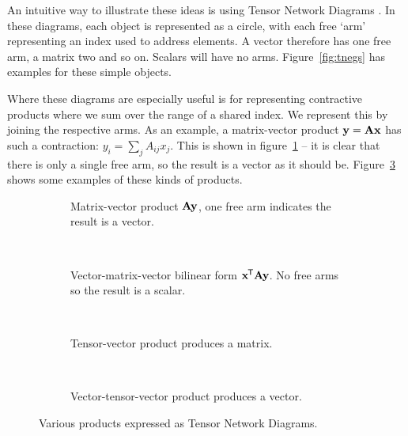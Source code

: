 An intuitive way to illustrate these ideas is using Tensor Network Diagrams
\autocite{Cichocki2016, Orus2014}. In these diagrams, each object is represented
as a circle, with each free `arm' representing an index used to address elements.
A vector therefore has one free arm, a matrix two and so on. Scalars will have
no arms. Figure~\ref{fig:tnegs} has examples for these simple objects. 

Where these diagrams are especially useful is for representing contractive products
where we sum over the range of a shared index. We represent this by joining the
respective arms. As an example, a matrix-vector product \(\mathbf{y} = \mathbf{Ax}\)
has such a contraction: \(y_{i} = \sum_{j}A_{ij}x_{j}\). This is shown in
figure~\ref{fig:tnmatvec} -- it is clear that there is only a single free arm, so the
result is a vector as it should be. Figure~\ref{fig:tnprods} shows some examples
of these kinds of products.

\begin{figure}
	\centering
	\begin{subfigure}[t]{0.45\textwidth}
		\centering
		\caption{Matrix-vector product \(\mathbf{A}\mathbf{y}\), one free arm indicates
		 the result is a vector.}
		 \label{fig:tnmatvec}
	\end{subfigure} ~
	\begin{subfigure}[t]{0.45\textwidth}
		\centering
		\caption{Vector-matrix-vector bilinear form \(\mathbf{x}^{\mkern-1.5mu\mathsf{T}}\mathbf{A}
				 \mathbf{y}\). No free arms so the result is a scalar.}
	\end{subfigure}\\
	\begin{subfigure}[t]{0.45\textwidth}
		\centering
		\caption{Tensor-vector product produces a matrix.}
	\end{subfigure} ~
	\begin{subfigure}[t]{0.45\textwidth}
		\centering
		\caption{Vector-tensor-vector product produces a vector.}
		\label{fig:vanillabilintnd}
	\end{subfigure}
	\caption{Various products expressed as Tensor Network Diagrams.}
	\label{fig:tnprods}
\end{figure}

